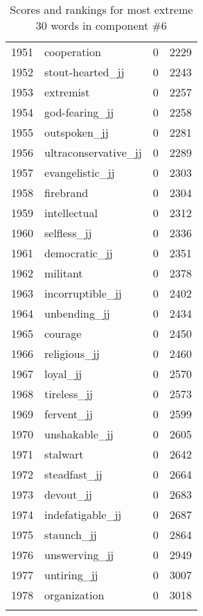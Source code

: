 \begin{longtable}[!htbp]{| rlr@{.}l |}
    1951 & cooperation & 0 & 2229 \\
    1952 & stout-hearted\_jj & 0 & 2243 \\
    1953 & extremist & 0 & 2257 \\
    1954 & god-fearing\_jj & 0 & 2258 \\
    1955 & outspoken\_jj & 0 & 2281 \\
    1956 & ultraconservative\_jj & 0 & 2289 \\
    1957 & evangelistic\_jj & 0 & 2303 \\
    1958 & firebrand & 0 & 2304 \\
    1959 & intellectual & 0 & 2312 \\
    1960 & selfless\_jj & 0 & 2336 \\
    1961 & democratic\_jj & 0 & 2351 \\
    1962 & militant & 0 & 2378 \\
    1963 & incorruptible\_jj & 0 & 2402 \\
    1964 & unbending\_jj & 0 & 2434 \\
    1965 & courage & 0 & 2450 \\
    1966 & religious\_jj & 0 & 2460 \\
    1967 & loyal\_jj & 0 & 2570 \\
    1968 & tireless\_jj & 0 & 2573 \\
    1969 & fervent\_jj & 0 & 2599 \\
    1970 & unshakable\_jj & 0 & 2605 \\
    1971 & stalwart & 0 & 2642 \\
    1972 & steadfast\_jj & 0 & 2664 \\
    1973 & devout\_jj & 0 & 2683 \\
    1974 & indefatigable\_jj & 0 & 2687 \\
    1975 & staunch\_jj & 0 & 2864 \\
    1976 & unswerving\_jj & 0 & 2949 \\
    1977 & untiring\_jj & 0 & 3007 \\
    1978 & organization & 0 & 3018 \\
    \hline
    \caption{Scores and rankings for most extreme 30 words in component \#6} \\
\end{longtable}
